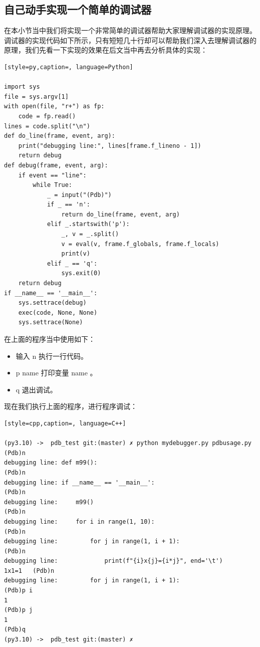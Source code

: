 \subsection{自己动手实现一个简单的调试器}
在本小节当中我们将实现一个非常简单的调试器帮助大家理解调试器的实现原理。调试器的实现代码如下所示，只有短短几十行却可以帮助我们深入去理解调试器的原理，我们先看一下实现的效果在后文当中再去分析具体的实现：
\begin{lstlisting}[style=py,caption=, language=Python]

import sys
file = sys.argv[1]
with open(file, "r+") as fp:
    code = fp.read()
lines = code.split("\n")
def do_line(frame, event, arg):
    print("debugging line:", lines[frame.f_lineno - 1])
    return debug
def debug(frame, event, arg):
    if event == "line":
        while True:
            _ = input("(Pdb)")
            if _ == 'n':
                return do_line(frame, event, arg)
            elif _.startswith('p'):
                _, v = _.split()
                v = eval(v, frame.f_globals, frame.f_locals)
                print(v)
            elif _ == 'q':
                sys.exit(0)
    return debug
if __name__ == '__main__':
    sys.settrace(debug)
    exec(code, None, None)
    sys.settrace(None)
\end{lstlisting}
在上面的程序当中使用如下：
\begin{itemize}
\item 输入 n 执行一行代码。 
\item p name 打印变量 name 。 
\item q 退出调试。 
\end{itemize}
现在我们执行上面的程序，进行程序调试：
\begin{lstlisting}[style=cpp,caption=, language=C++]

(py3.10) ->  pdb_test git:(master) ✗ python mydebugger.py pdbusage.py
(Pdb)n
debugging line: def m99():
(Pdb)n
debugging line: if __name__ == '__main__':
(Pdb)n
debugging line:     m99()
(Pdb)n
debugging line:     for i in range(1, 10):
(Pdb)n
debugging line:         for j in range(1, i + 1):
(Pdb)n
debugging line:             print(f"{i}x{j}={i*j}", end='\t')
1x1=1   (Pdb)n
debugging line:         for j in range(1, i + 1):
(Pdb)p i
1
(Pdb)p j
1
(Pdb)q
(py3.10) ->  pdb_test git:(master) ✗ 
\end{lstlisting}
    
